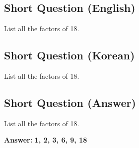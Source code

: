 \cleardoublepage
\subsection*{Short Question (English)}
List all the factors of 18.


\newpage
\subsection*{Short Question (Korean)}
List all the factors of 18.


\newpage
\subsection*{Short Question (Answer)}
List all the factors of 18.

\textbf{Answer:} \textbf{1, 2, 3, 6, 9, 18}
